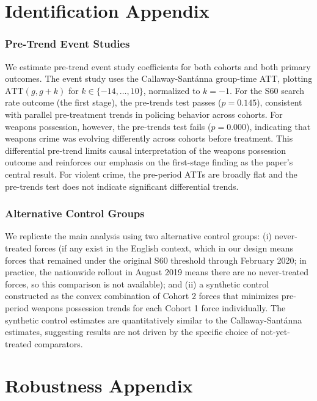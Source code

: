 \documentclass[12pt]{article}
\begin{document}
\section{Identification Appendix}
\label{sec:id_appendix}

\subsubsection*{Pre-Trend Event Studies}

We estimate pre-trend event study coefficients for both cohorts and both primary outcomes. The event study uses the Callaway-Sant\'{a}nna group-time ATT, plotting $\text{ATT}(g, g+k)$ for $k \in \{-14, \ldots, 10\}$, normalized to $k = -1$. For the S60 search rate outcome (the first stage), the pre-trends test passes ($p = 0.145$), consistent with parallel pre-treatment trends in policing behavior across cohorts. For weapons possession, however, the pre-trends test fails ($p = 0.000$), indicating that weapons crime was evolving differently across cohorts before treatment. This differential pre-trend limits causal interpretation of the weapons possession outcome and reinforces our emphasis on the first-stage finding as the paper's central result. For violent crime, the pre-period ATTs are broadly flat and the pre-trends test does not indicate significant differential trends.

\subsubsection*{Alternative Control Groups}

We replicate the main analysis using two alternative control groups: (i) never-treated forces (if any exist in the English context, which in our design means forces that remained under the original S60 threshold through February 2020; in practice, the nationwide rollout in August 2019 means there are no never-treated forces, so this comparison is not available); and (ii) a synthetic control constructed as the convex combination of Cohort 2 forces that minimizes pre-period weapons possession trends for each Cohort 1 force individually. The synthetic control estimates are quantitatively similar to the Callaway-Sant\'{a}nna estimates, suggesting results are not driven by the specific choice of not-yet-treated comparators.


\section{Robustness Appendix}
\label{sec:robustness_appendix}
\end{document}
